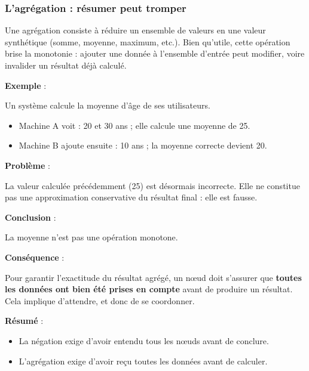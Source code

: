 \documentclass[12pt,a4paper]{article}
\begin{document}
\subsubsection{L'agrégation : résumer peut tromper}

Une agrégation consiste à réduire un ensemble de valeurs en une valeur synthétique
(somme, moyenne, maximum, etc.). Bien qu'utile, cette opération brise la monotonie :
ajouter une donnée à l'ensemble d'entrée peut modifier, voire invalider un résultat
déjà calculé.

\bigskip

\textbf{Exemple} :


\bigskip


Un système calcule la moyenne d'âge de ses utilisateurs.

\begin{itemize}
    \item Machine A voit : 20 et 30 ans ; elle calcule une moyenne de 25.
    \item Machine B ajoute ensuite : 10 ans ; la moyenne correcte devient 20.
\end{itemize}

\textbf{Problème} :

\bigskip

La valeur calculée précédemment (25) est désormais incorrecte. Elle ne constitue
pas une approximation conservative du résultat final : elle est fausse.

\bigskip

\textbf{Conclusion} :

\bigskip

La moyenne n'est pas une opération monotone.

\bigskip

\textbf{Conséquence} :

\bigskip

Pour garantir l'exactitude du résultat agrégé, un nœud doit s'assurer que
\textbf{toutes les données ont bien été prises en compte} avant de produire un résultat.
Cela implique d'attendre, et donc de se coordonner.

\bigskip

\textbf{Résumé} :
\begin{itemize}
    \item La négation exige d'avoir entendu tous les nœuds avant de conclure.
    \item L'agrégation exige d'avoir reçu toutes les données avant de calculer.
\end{itemize}
\end{document}
